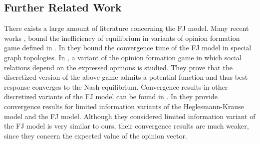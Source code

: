 
\subsection{Further Related Work}

There exists a large amount of literature concerning the FJ model.
Many recent works \cite{BGM13,CKO13}, \cite{BFM16,EFHS17}
bound the inefficiency of equilibrium in variants of opinion formation game
defined in \cite{BKO11}. In \cite{GS14} they bound the convergence time of the
FJ model in special graph topologies.  In \cite{BFM16}, a variant of the
opinion formation game in which social relations depend on the expressed
opinions is studied.  They prove that the discretized version of the above game
admits a potential function and thus best-response converges to the Nash
equilibrium.  Convergence results in other discretized variants of the FJ model
can be found in \cite{YOASS13,FGV16}. In \cite{FPS16} they provide convergence
results for limited information variants of the Heglesmann-Krause model
\cite{HK} and the FJ model. Although they considered limited information variant
of the FJ model is very similar to ours, their convergence
results are much weaker, since they concern the expected value of the
opinion vector.

